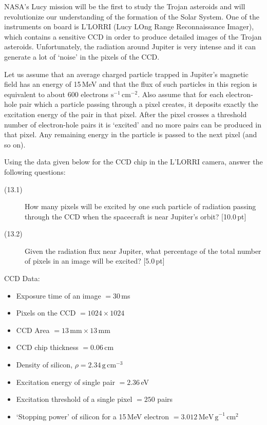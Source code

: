 
NASA's Lucy mission will be the first to study the Trojan asteroids and will
revolutionize our understanding of the formation of the Solar System. One of
the instruments on board is L'LORRI (Lucy LOng Range Reconnaissance Imager),
which contains a sensitive CCD in order to produce detailed images of the
Trojan asteroids. Unfortunately, the radiation around Jupiter is very intense
and it can generate a lot of `noise' in the pixels of the CCD.

Let us assume that an average charged particle trapped in Jupiter's magnetic
field has an energy of 15\,MeV and that the flux of such particles in this
region is equivalent to about 600 electrons $\mathrm{s}^{-1}\,
\mathrm{cm}^{-2}$. Also assume that for each electron-hole pair which a
particle passing through a pixel creates, it deposits exactly the excitation
energy of the pair in that pixel. After the pixel crosses a threshold number
of electron-hole pairs it is `excited' and no more pairs can be produced in
that pixel. Any remaining energy in the particle is passed to the next pixel
(and so on).

Using the data given below for the CCD chip in the L'LORRI camera, answer the
following questions:

\begin{description}
\item[(13.1)] How many pixels will be excited by one such particle of
  radiation passing through the CCD when the spacecraft is near Jupiter's
  orbit? \hfill[10.0\,pt]
\item[(13.2)] Given the radiation flux near Jupiter, what percentage of the
  total number of pixels in an image will be excited? \hfill[5.0\,pt]
\end{description}

CCD Data:
\begin{itemize}
\item Exposure time of an image $= 30$\,ms
\item Pixels on the CCD $= 1024 \times 1024$
\item CCD Area $= 13\,\mathrm{mm} \times 13\,\mathrm{mm}$
\item CCD chip thickness $= 0.06$\,cm
\item Density of silicon, $\rho = 2.34\,\mathrm{g\,cm}^{-3}$
\item Excitation energy of single pair $= 2.36$\,eV
\item Excitation threshold of a single pixel $= 250$ pairs
\item `Stopping power' of silicon for a 15\,MeV electron
  $= 3.012\,\mathrm{MeV\,g}^{-1}\,\mathrm{cm}^{2}$
\end{itemize}

